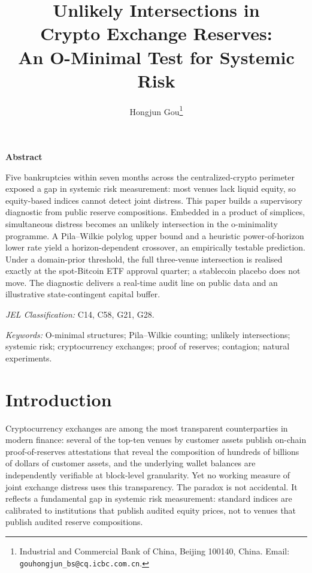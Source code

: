\documentclass[12pt]{article}
\date{}
\theoremstyle{sampledef}
\theoremstyle{sampleplain}
\theoremstyle{sampleremark}
\newcommand{\1}{\mathbf{1}}
\begin{document}
\title{Unlikely Intersections in\\ Crypto Exchange Reserves:\\
An O-Minimal Test for Systemic Risk}

\author{Hongjun Gou\thanks{Industrial and Commercial Bank of China,
  Beijing 100140, China. Email: \texttt{gouhongjun\_bs@cq.icbc.com.cn}.}}

\maketitle

\begin{center}\textbf{Abstract}\end{center}

Five bankruptcies within seven months across the
centralized-crypto perimeter exposed a gap in systemic risk
measurement: most venues lack liquid equity, so equity-based
indices cannot detect joint distress. This paper builds a
supervisory diagnostic from public reserve compositions. Embedded
in a product of simplices, simultaneous distress becomes an
unlikely intersection in the o-minimality programme. A
Pila--Wilkie polylog upper bound and a heuristic power-of-horizon
lower rate yield a horizon-dependent crossover, an empirically
testable prediction. Under a domain-prior threshold, the full
three-venue intersection is realised exactly at the spot-Bitcoin
ETF approval quarter; a stablecoin placebo does not move. The
diagnostic delivers a real-time audit line on public data and an
illustrative state-contingent capital buffer.

\vspace{1em}
\noindent\emph{JEL Classification:} C14, C58, G21, G28.

\vspace{0.5em}
\noindent\emph{Keywords:} O-minimal structures; Pila--Wilkie
counting; unlikely intersections; systemic risk; cryptocurrency
exchanges; proof of reserves; contagion; natural experiments.

\bigskip

\section{Introduction}\label{sec:intro}

Cryptocurrency exchanges are among the most transparent
counterparties in modern finance: several of the top-ten venues by
customer assets publish on-chain proof-of-reserves attestations
that reveal the composition of hundreds of billions of dollars of
customer assets, and the underlying wallet balances are
independently verifiable at block-level granularity. Yet no
working measure of joint exchange distress uses this transparency.
The paradox is not accidental. It reflects a fundamental gap in
systemic risk measurement: standard indices are calibrated to
institutions that publish audited equity prices, not to venues
that publish audited reserve compositions.
\end{document}
